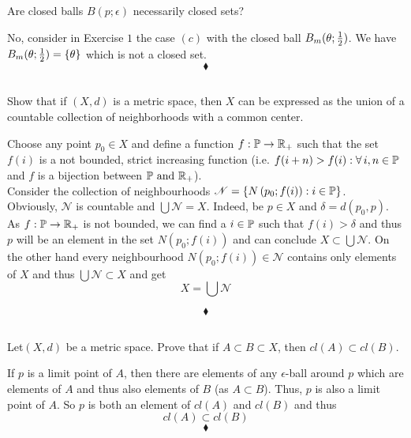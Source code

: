 \subsection{}
\begin{tcolorbox}
Are closed balls $B(p;\epsilon)$  necessarily closed sets?
\end{tcolorbox}
No, consider in Exercise $1$ the case $(c)$ with the closed ball $B_m(\theta; \frac{1}{2})$. We have $B_m(\theta; \frac{1}{2})=\{\theta\}$ which is not a closed set.
$$\blacklozenge$$

\subsection{}
\begin{tcolorbox}
Show that if $\left(X,d\right)$ is a metric space, then $X$ can be expressed as the union of a countable collection of neighborhoods with a common center.
\end{tcolorbox}
Choose any point $p_0\in X$ and define a function $f:\mathbb{P}\rightarrow \mathbb{R}_+$ such that the set $f(i)$ is a not bounded, strict increasing function  (i.e. $f(i+n)>f(i):\forall\, i,n\in\mathbb{P}$ and  $f$ is a bijection between $\mathbb{P} \text{ and } \mathbb{R}_+$).\\
Consider the collection of neighbourhoods $\mathscr{N}=\{ N\left(p_0;f(i)\right):i\in\mathbb{P}\}$.\\
Obviously, $\mathscr{N}$ is countable and $\bigcup \mathscr{N}= X$. Indeed, be $p\in X$ and $\delta = d(p_0,p)$.\\
As $f:\mathbb{P}\rightarrow \mathbb{R}_+$  is not bounded, we can find a $i\in\mathbb{P}$ such that  $f(i)> \delta$ and thus $p$ will be an element in the set $N\left(p_0;f(i)\right)$ and can conclude $X\subset\bigcup \mathscr{N}$. On the other hand every neighbourhood $N\left(p_0;f(i)\right) \in \mathscr{N}$ contains only elements of $X$ and thus $\bigcup \mathscr{N}\subset X$ and get 
$$X=\bigcup \mathscr{N}$$

$$\blacklozenge$$

\subsection{}
\begin{tcolorbox}
Let$\left(X,d\right)$  be a metric space. Prove that if $A \subset B \subset X$, then $cl(A) \subset cl(B)$.
\end{tcolorbox}
If $p$ is a limit point of $A$, then there are elements of any $\epsilon$-ball around $p$ which are elements of $A$ and thus also elements of $B$ (as $A\subset B$). Thus, $p$ is also a limit point of $A$. So $p$ is both an element of $cl(A)$ and $cl(B)$ and thus  
$$cl(A)\subset cl(B)$$
$$\blacklozenge$$

